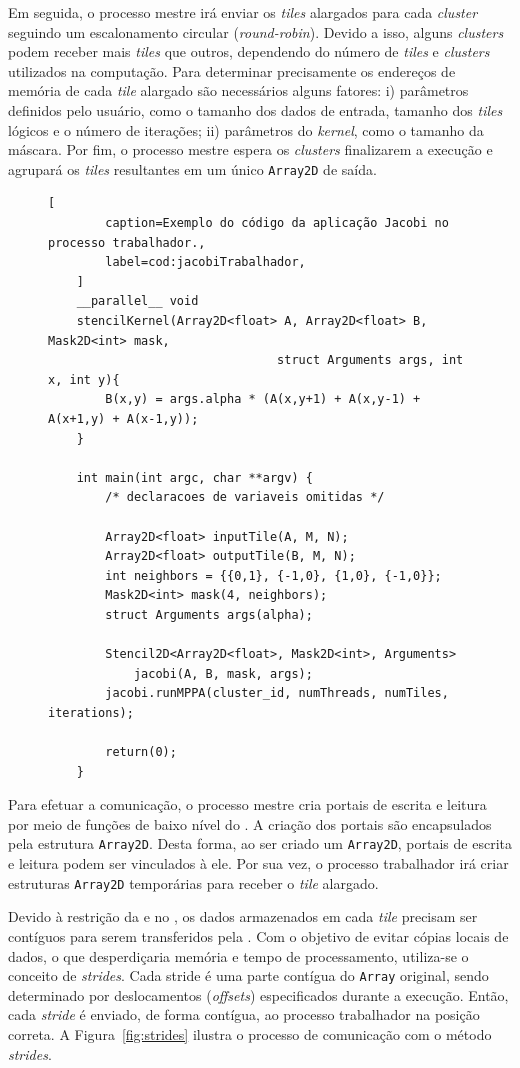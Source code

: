 Em seguida, o processo mestre irá enviar os \textit{tiles} alargados para cada
\textit{cluster} seguindo um escalonamento circular (\textit{round-robin}).
Devido a isso, alguns \textit{clusters} podem receber mais \textit{tiles} que
outros, dependendo do número de \textit{tiles} e \textit{clusters} utilizados na
computação. Para determinar precisamente os endereços de memória de
cada \textit{tile} alargado são necessários alguns fatores: i) parâmetros
definidos pelo usuário, como o tamanho dos dados de entrada, tamanho dos
\textit{tiles} lógicos e o número de iterações; ii) parâmetros do \stencil
\textit{kernel}, como o tamanho da máscara. Por fim, o processo mestre espera os
\textit{clusters} finalizarem a execução e agrupará os \textit{tiles}
resultantes em um único \texttt{Array2D} de saída.

\begin{figure}[!h]
	\begin{lstlisting}[
		caption=Exemplo do código da aplicação Jacobi no processo trabalhador.,
		label=cod:jacobiTrabalhador,
	]
	__parallel__ void
	stencilKernel(Array2D<float> A, Array2D<float> B, Mask2D<int> mask,
								struct Arguments args, int x, int y){
		B(x,y) = args.alpha * (A(x,y+1) + A(x,y-1) + A(x+1,y) + A(x-1,y));
	}

	int main(int argc, char **argv) {
		/* declaracoes de variaveis omitidas */

		Array2D<float> inputTile(A, M, N);
		Array2D<float> outputTile(B, M, N);
		int neighbors = {{0,1}, {-1,0}, {1,0}, {-1,0}};
		Mask2D<int> mask(4, neighbors);
		struct Arguments args(alpha);

		Stencil2D<Array2D<float>, Mask2D<int>, Arguments>
			jacobi(A, B, mask, args);
		jacobi.runMPPA(cluster_id, numThreads, numTiles, iterations);

		return(0);
	}
\end{lstlisting}
\end{figure}



Para efetuar a comunicação, o processo mestre cria portais de escrita e leitura
por meio de funções de baixo nível do \mppa. A criação dos portais são encapsulados pela
estrutura \texttt{Array2D}. Desta forma, ao ser criado um \texttt{Array2D},
portais de escrita e leitura podem ser vinculados à ele. Por sua vez, o
processo trabalhador irá criar estruturas \texttt{Array2D} temporárias para
receber o \textit{tile} alargado.

Devido à restrição da \api e \noc no \mppa, os dados armazenados em cada
\textit{tile} precisam ser contíguos para serem transferidos pela \noc. Com o
objetivo de evitar cópias locais de dados, o que desperdiçaria memória e tempo
de processamento, utiliza-se o conceito de \textit{strides}. Cada stride é uma
parte contígua do \texttt{Array} original, sendo determinado por deslocamentos
(\textit{offsets}) especificados durante a execução. Então, cada \textit{stride}
é enviado, de forma contígua, ao processo trabalhador na posição correta. A
Figura~\ref{fig:strides} ilustra o processo de comunicação com o método
\textit{strides}.

